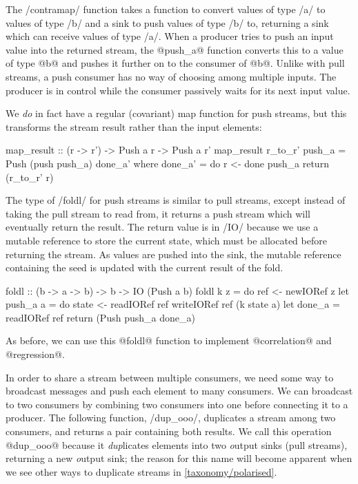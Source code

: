 The \Hs/contramap/ function takes a function to convert values of type \Hs/a/ to values of type \Hs/b/ and a sink to push values of type \Hs/b/ to, returning a sink which can receive values of type \Hs/a/.
When a producer tries to push an input value into the returned stream, the @push_a@ function converts this to a value of type @b@ and pushes it further on to the consumer of @b@.
Unlike with pull streams, a push consumer has no way of choosing among multiple inputs.
The producer is in control while the consumer passively waits for its next input value.

We \emph{do} in fact have a regular (covariant) map function for push streams, but this transforms the stream result rather than the input elements:

\begin{haskell}
map_result :: (r -> r') -> Push a r -> Push a r'
map_result r_to_r' push_a = Push (push push_a) done_a'
 where
  done_a' = do
    r <- done push_a
    return (r_to_r' r)
\end{haskell}

The type of \Hs/foldl/ for push streams is similar to pull streams, except instead of taking the pull stream to read from, it returns a push stream which will eventually return the result.
The return value is in \Hs/IO/ because we use a mutable reference to store the current state, which must be allocated before returning the stream.
As values are pushed into the sink, the mutable reference containing the seed is updated with the current result of the fold.

\begin{haskell}
foldl :: (b -> a -> b) -> b -> IO (Push a b)
foldl k z = do
  ref <- newIORef z
  let push_a a = do
       state <- readIORef ref
       writeIORef ref (k state a)
  let done_a = readIORef ref
  return (Push push_a done_a)
\end{haskell}

As before, we can use this @foldl@ function to implement @correlation@ and @regression@.

In order to share a stream between multiple consumers, we need some way to broadcast messages and push each element to many consumers.
We can broadcast to two consumers by combining two consumers into one before connecting it to a producer.
The following function, \Hs/dup_ooo/, duplicates a stream among two consumers, and returns a pair containing both results.
We call this operation @dup_ooo@ because it \emph{dup}licates elements into two \emph{o}utput sinks (pull streams), returning a new \emph{o}utput sink; the reason for this name will become apparent when we see other ways to duplicate streams in \cref{taxonomy/polarised}.

